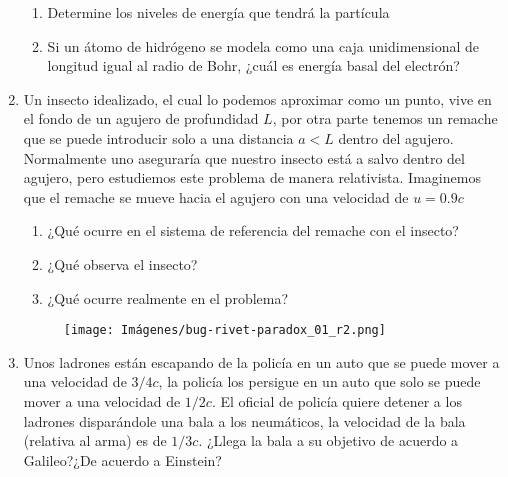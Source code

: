 \documentclass[letterpaper,11pt]{article}
\begin{document}
\begin{enumerate}
    \begin{enumerate}

        \item Determine los niveles de energía que tendrá la partícula
        
        \item Si un átomo de hidrógeno se modela como una caja unidimensional de longitud igual al radio de Bohr, ¿cuál es energía basal del electrón?
    \end{enumerate}

\item Un insecto idealizado, el cual lo podemos aproximar como un punto, vive en el fondo de un agujero de profundidad $L$, por otra parte tenemos un remache que se puede introducir solo a una distancia $a<L$ dentro del agujero. Normalmente uno aseguraría que nuestro insecto está a salvo dentro del agujero, pero estudiemos este problema de manera relativista. Imaginemos que el remache se mueve hacia el agujero con una velocidad de $u=0.9c$

\begin{multicols}{2}
    \begin{enumerate}
        \item ¿Qué ocurre en el sistema de referencia del remache con el insecto?
        \item ¿Qué observa el insecto?
        \item ¿Qué ocurre realmente en el problema?
    \end{enumerate}
    
    \columnbreak
    \begin{figure}[H]
        \centering
        \texttt{[image: Imágenes/bug-rivet-paradox\_01\_r2.png]}
    \end{figure}    
\end{multicols}


\item Unos ladrones están escapando de la policía en un auto que se puede mover a una velocidad de $3/4 c$, la policía los persigue en un auto que solo se puede mover a una velocidad de $1/2 c$. El oficial de policía quiere detener a los ladrones disparándole una bala a los neumáticos, la velocidad de la bala (relativa al arma) es de $1/3 c$. ¿Llega la bala a su objetivo de acuerdo a Galileo?¿De acuerdo a Einstein?
\end{enumerate}
\end{document}
